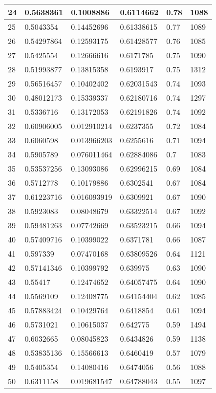 \begin{longtable}{|l|l|l|l|l|l|}
24 & 0.5638361 & 0.1008886 & 0.6114662 & 0.78 & 1088 \\ \hline 
25 & 0.5043354 & 0.14452696 & 0.61338615 & 0.77 & 1089 \\ \hline 
26 & 0.54297864 & 0.12593175 & 0.61428577 & 0.76 & 1085 \\ \hline 
27 & 0.5425554 & 0.12666616 & 0.6171785 & 0.75 & 1090 \\ \hline 
28 & 0.51993877 & 0.13815358 & 0.6193917 & 0.75 & 1312 \\ \hline 
29 & 0.56516457 & 0.10402402 & 0.62031543 & 0.74 & 1093 \\ \hline 
30 & 0.48012173 & 0.15339337 & 0.62180716 & 0.74 & 1297 \\ \hline 
31 & 0.5336716 & 0.13172053 & 0.62191826 & 0.74 & 1092 \\ \hline 
32 & 0.60906005 & 0.012910214 & 0.6237355 & 0.72 & 1084 \\ \hline 
33 & 0.6060598 & 0.013966203 & 0.6255616 & 0.71 & 1094 \\ \hline 
34 & 0.5905789 & 0.076011464 & 0.62884086 & 0.7 & 1083 \\ \hline 
35 & 0.53537256 & 0.13093086 & 0.62996215 & 0.69 & 1084 \\ \hline 
36 & 0.5712778 & 0.10179886 & 0.6302541 & 0.67 & 1084 \\ \hline 
37 & 0.61223716 & 0.016093919 & 0.6309921 & 0.67 & 1090 \\ \hline 
38 & 0.5923083 & 0.08048679 & 0.63322514 & 0.67 & 1092 \\ \hline 
39 & 0.59481263 & 0.07742669 & 0.63523215 & 0.66 & 1094 \\ \hline 
40 & 0.57409716 & 0.10399022 & 0.6371781 & 0.66 & 1087 \\ \hline 
41 & 0.597339 & 0.07470168 & 0.63809526 & 0.64 & 1121 \\ \hline 
42 & 0.57141346 & 0.10399792 & 0.639975 & 0.63 & 1090 \\ \hline 
43 & 0.55417 & 0.12474652 & 0.64057475 & 0.64 & 1090 \\ \hline 
44 & 0.5569109 & 0.12408775 & 0.64154404 & 0.62 & 1085 \\ \hline 
45 & 0.57883424 & 0.10429764 & 0.6418854 & 0.61 & 1094 \\ \hline 
46 & 0.5731021 & 0.10615037 & 0.642775 & 0.59 & 1494 \\ \hline 
47 & 0.6032665 & 0.08045823 & 0.6434826 & 0.59 & 1138 \\ \hline 
48 & 0.53835136 & 0.15566613 & 0.6460419 & 0.57 & 1079 \\ \hline 
49 & 0.5405354 & 0.14080416 & 0.6474056 & 0.56 & 1088 \\ \hline 
50 & 0.6311158 & 0.019681547 & 0.64788043 & 0.55 & 1097 \\ \hline 
\end{longtable}